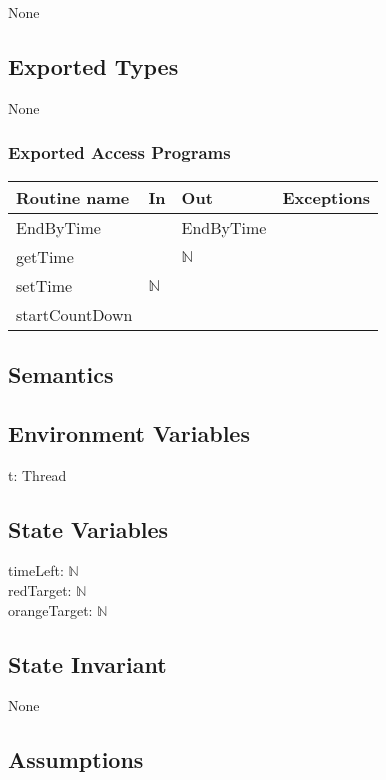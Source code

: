 \documentclass[12pt]{article}
\begin{document}
None

\subsection*{Exported Types}

None

\subsubsection* {Exported Access Programs}

\begin{tabular}{| l | l | l | p{6cm} |}
\hline
\textbf{Routine name} & \textbf{In} & \textbf{Out} & \textbf{Exceptions}\\
\hline
EndByTime & ~ & EndByTime    & \\
\hline
getTime & ~ & $\mathbb{N}$ & \\
\hline
setTime & $\mathbb{N}$ & ~ & \\
\hline
startCountDown & ~ & ~ & \\
\hline
\end{tabular}

\subsection* {Semantics}

\subsection*{Environment Variables}

t: Thread

\subsection*{State Variables}

timeLeft: $\mathbb{N}$ \\
redTarget: $\mathbb{N}$ \\
orangeTarget: $\mathbb{N}$ \\

\subsection*{State Invariant}

None

\subsection*{Assumptions}
\end{document}
